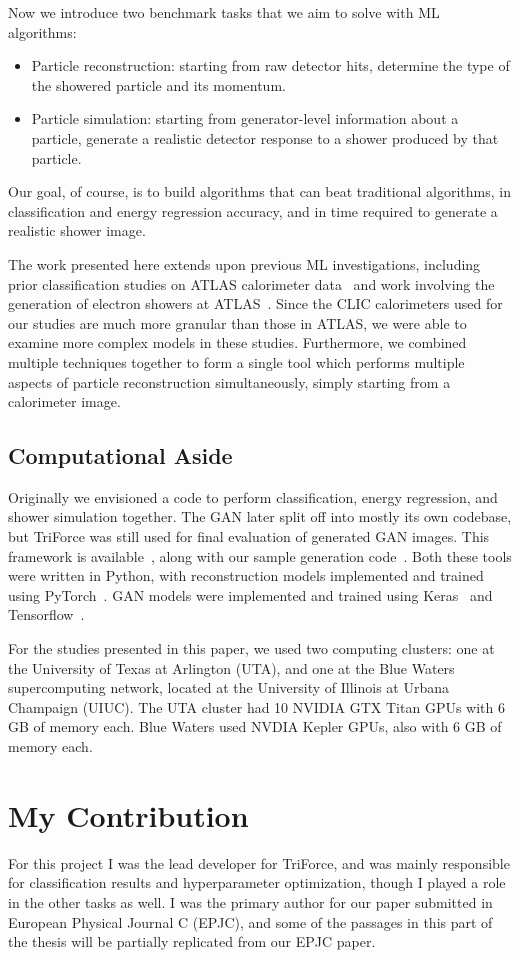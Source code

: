Now we introduce two benchmark tasks that we aim to solve with ML algorithms: 
\begin{itemize}
    \item Particle reconstruction: starting from raw detector hits, determine the type of the showered particle and its momentum.
    \item Particle simulation: starting from generator-level information about a particle, generate a realistic detector response to a shower produced by that particle.
\end{itemize}

Our goal, of course, is to build algorithms that can beat traditional algorithms, in classification and energy regression accuracy, and in time required to generate a realistic shower image.

The work presented here extends upon previous ML investigations, including prior classification studies on ATLAS calorimeter data~\cite{Nachman_DNN} and work involving the generation of electron showers at ATLAS~\cite{Nachman_GAN,Nachman_GAN2}. Since the CLIC calorimeters used for our studies are much more granular than those in ATLAS, we were able to examine more complex models in these studies. Furthermore, we combined multiple techniques together to form a single tool which performs multiple aspects of particle reconstruction simultaneously, simply starting from a calorimeter image.

\subsection*{Computational Aside}

Originally we envisioned a code to perform classification, energy regression, and shower simulation together. The GAN later split off into mostly its own codebase, but TriForce was still used for final evaluation of generated GAN images. This framework is available~\cite{TriForce}, along with our sample generation code~\cite{CaloSampleGeneration}. Both these tools were written in Python, with reconstruction models implemented and trained using PyTorch~\cite{PyTorch}. GAN models were implemented and trained using Keras~\cite{keras} and  Tensorflow~\cite{tensorflow2015-whitepaper}.

For the studies presented in this paper, we used two computing clusters: one at the University of Texas at Arlington (UTA), and one at the Blue Waters supercomputing network, located at the University of Illinois at Urbana Champaign (UIUC). The UTA cluster had 10 NVIDIA GTX Titan GPUs with 6 GB of memory each. Blue Waters used NVDIA Kepler GPUs, also with 6 GB of memory each.

\section{My Contribution}

For this project I was the lead developer for TriForce, and was mainly responsible for classification results and hyperparameter optimization, though I played a role in the other tasks as well. I was the primary author for our paper submitted in European Physical Journal C (EPJC), and some of the passages in this part of the thesis will be partially replicated from our EPJC paper.